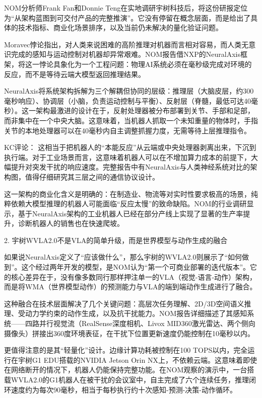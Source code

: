 \documentclass[11pt]{ctexart}
\begin{document}
NOM分析师Frank Fan和Donnie Teng在实地调研宇树科技后，将这份研报定位为“从架构蓝图到可交付产品的完整推演”。它没有停留在概念层面，而是给出了具体的技术指标、商业化场景排序，以及当前仍未解决的量化验证问题。

Moravec悖论指出，对人类来说困难的高阶推理对机器而言相对容易，而人类无意识完成的感知与运动控制对机器却异常艰难。NOM报告借NXP的NeuralAxis框架，将这一悖论具象化为一个工程问题：物理AI系统必须在毫秒级完成对环境的反应，而不是等待云端大模型返回推理结果。

NeuralAxis将系统架构拆解为三个解耦但协同的层级：推理层（大脑皮层，约300毫秒响应）、协调层（小脑，负责运动控制与平衡）、反射层（脊髓，最低可达40毫秒）。这一架构最激进的设计在于，反射处理器被分布部署到关节、手部和足部，而非集中在一个中央大脑。这意味着，当机器人抓取一个未知重量的物体时，手指关节的本地处理器可以在40毫秒内自主调整抓握力度，无需等待上层推理指令。

KC评论： 这相当于把机器人的“本能反应”从云端或中央处理器剥离出来，下沉到执行端。对于工业场景而言，这意味着机器人可以在不增加算力成本的前提下，大幅提升对突发干扰的响应速度。完整报告中有NeuralAxis与人类神经系统对比的架构图，值得仔细研究其三层之间的通信协议设计。

这一架构的商业化含义是明确的：在制造业、物流等对实时性要求极高的场景，纯粹依赖大模型推理的机器人可能面临“反应太慢”的致命缺陷。NOM的行业调研显示，基于NeuralAxis架构的工业机器人已经在部分产线上实现了显著的生产率提升，诊断机器人的销售也在快速爬坡。

2. 宇树WVLA2.0不是VLA的简单升级，而是世界模型与动作生成的融合

如果说NeuralAxis定义了“应该做什么”，那么宇树的WVLA2.0则展示了“如何做到”。这个经过两年开发的模型，是NOM认为“第一个可商业部署的迭代版本”。它的核心差异在于，没有像多数同行那样押注单一的VLA（视觉-语言-动作）架构，而是将WMA（世界模型动作）的预测能力与VLA的端到端动作生成进行了融合。

这种融合在技术层面解决了几个关键问题：高层次任务理解、2D/3D空间语义推理、受动力学约束的动作生成，以及抗干扰能力。NOM报告详细描述了其感知系统——四路并行视觉流（RealSense深度相机、Livox MID360激光雷达、两个侧向摄像头）拼接出360度环境表征，在干扰下位置更新速度仍能控制在10毫秒以内。

更值得注意的是其“轻量化”设计。边缘计算功耗被控制在100 TOPS以内，完全运行在宇树G1 EDU搭载的NVIDIA Jetson Orin NX上，不依赖云端。这意味着即使在网络断开的情况下，机器人仍能保持完整功能。在NOM观察的演示中，一台搭载WVLA2.0的G1机器人在被干扰的会议室中，自主完成了六个连续任务，推理闭环速度约为每次90毫秒，相当于每秒执行约十次感知-预测-决策-动作循环。
\end{document}

